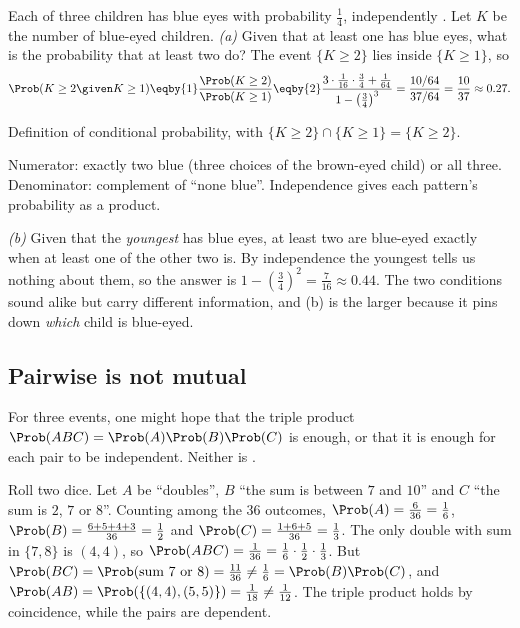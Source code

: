 \label{1a:ex:blue-eyes}
Each of three children has blue eyes with probability $\tfrac14$, independently
. Let $K$ be the number of blue-eyed children.
\emph{(a)} Given that at least one has blue eyes, what is the probability that at
least two do? The event $\{K\ge2\}$ lies inside $\{K\ge1\}$, so
\begin{align*}
\Prob(K\ge2\given K\ge1)\eqby{1}\frac{\Prob(K\ge2)}{\Prob(K\ge1)}
\eqby{2}\frac{3\cdot\tfrac1{16}\cdot\tfrac34+\tfrac1{64}}{1-\bigl(\tfrac34\bigr)^3}
=\frac{10/64}{37/64}=\frac{10}{37}\approx0.27 .
\end{align*}
\begin{explain}
  \item Definition of conditional probability, with $\{K\ge2\}\cap\{K\ge1\}=\{K\ge2\}$.
  \item Numerator: exactly two blue (three choices of the brown-eyed child) or
        all three. Denominator: complement of ``none blue''. Independence gives
        each pattern's probability as a product.
\end{explain}
\emph{(b)} Given that the \emph{youngest} has blue eyes, at least two are blue-eyed
exactly when at least one of the other two is. By independence the youngest
tells us nothing about them, so the answer is $1-(\tfrac34)^2=\tfrac7{16}\approx0.44$.
The two conditions sound alike but carry different information, and (b) is
the larger because it pins down \emph{which} child is blue-eyed.

\subsection{Pairwise is not mutual}

For three events, one might hope that the triple product
$\Prob(ABC)=\Prob(A)\Prob(B)\Prob(C)$ is enough, or that it is enough for each pair to be
independent. Neither is .

\label{1a:ex:triple-no-pairs}
Roll two dice. Let $A$ be ``doubles'', $B$ ``the sum is between $7$ and $10$'' and $C$
``the sum is $2$, $7$ or $8$''. Counting among the $36$ outcomes, $\Prob(A)=\tfrac6{36}=\tfrac16$,
$\Prob(B)=\tfrac{6+5+4+3}{36}=\tfrac12$ and $\Prob(C)=\tfrac{1+6+5}{36}=\tfrac13$. The only double with
sum in $\{7,8\}$ is $(4,4)$, so $\Prob(ABC)=\tfrac1{36}=\tfrac16\cdot\tfrac12\cdot\tfrac13$. But
$\Prob(BC)=\Prob(\text{sum }7\text{ or }8)=\tfrac{11}{36}\neq\tfrac16=\Prob(B)\Prob(C)$, and
$\Prob(AB)=\Prob(\{(4,4),(5,5)\})=\tfrac1{18}\neq\tfrac1{12}$. The triple product holds by
coincidence, while the pairs are dependent.


